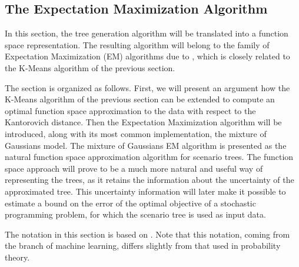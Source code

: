 \subsection{The Expectation Maximization Algorithm}
\label{sec:k-means-as-EM}
In this section, the tree generation algorithm will be translated into a function space representation.
The resulting algorithm will belong to the family of Expectation Maximization (EM) algorithms due to , which is closely related to the K-Means algorithm of the previous section.

The section is organized as follows.
First, we will present an argument how the K-Means algorithm of the previous section can be extended to compute an optimal function space approximation to the data with respect to the Kantorovich distance.
Then the Expectation Maximization algorithm will be introduced, along with its most common implementation, the mixture of Gaussians model.
The mixture of Gaussians EM algorithm is presented as the natural function space approximation algorithm for scenario trees.
The function space approach will prove to be a much more natural and useful way of representing the trees, as it retains the information about the uncertainty of the approximated tree.
This uncertainty information will later make it possible to estimate a bound on the error of the optimal objective of a stochastic programming problem, for which the scenario tree is used as input data.

The notation in this section is based on .
Note that this notation, coming from the branch of machine learning, differs slightly from that used in probability theory.
